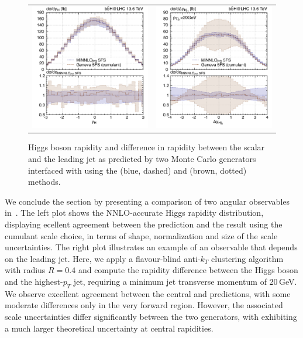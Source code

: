 \documentclass[11pt,a4paper]{article}
\begin{document}
\begin{figure}[b!]
\begin{center}
\begin{tabular}{cc}
\includegraphics[width=.45\textwidth, page=1]{plots/5fs/genevaminnlo/minnloKQvar-geneva-yh.pdf}&
\includegraphics[width=.45\textwidth, page=1]{plots/5fs/genevaminnlo/minnloKQvar-geneva-dyhj.pdf}
\end{tabular}
\vspace*{1ex}
\caption{Higgs boson rapidity and difference in rapidity between the scalar and the leading jet as predicted by two Monte Carlo generators interfaced with  using the \minnlo{} (blue, dashed) and \GENEVA{} (brown, dotted) methods. \label{fig:genevay}}
\end{center}
\end{figure}

We conclude the section by presenting a comparison of two angular observables in~. The left plot shows the NNLO-accurate Higgs rapidity distribution, displaying ecellent agreement between the \minnlo{} prediction and the \GENEVA{} result using the cumulant scale choice, in terms of shape, normalization and size of the scale uncertainties. 
The right plot illustrates an example of an observable that depends on the leading jet. Here, we apply a flavour-blind anti-$k_T$ clustering algorithm with radius $R = 0.4$ and compute the rapidity difference between the Higgs boson and the highest-$p_T$ jet, requiring a minimum jet transverse momentum of 20\,GeV. We observe excellent agreement between the central \minnlo{} and 
\GENEVA{} predictions, with some moderate differences only in the very forward region. However, the associated scale uncertainties differ significantly between the two generators, with \GENEVA{} exhibiting a much larger theoretical uncertainty at central
rapidities.
\end{document}
